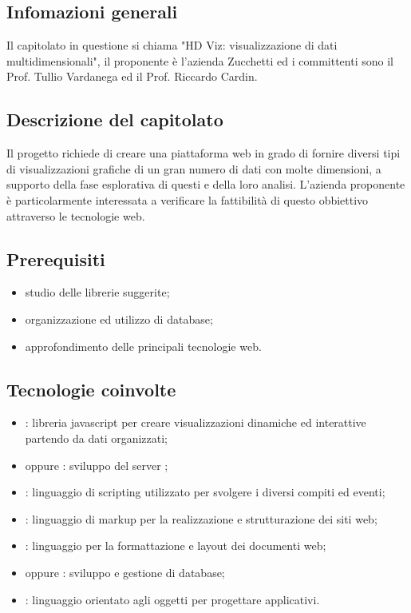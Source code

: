 
\subsection{Infomazioni generali}
Il capitolato in questione si chiama "HD Viz: visualizzazione di dati multidimensionali", il proponente è l'azienda Zucchetti ed i committenti sono il Prof. Tullio Vardanega ed il Prof. Riccardo Cardin.

\subsection{Descrizione del capitolato}
Il progetto richiede di creare una piattaforma web in grado di fornire diversi tipi di visualizzazioni grafiche di un gran numero di dati con molte dimensioni, a supporto della fase esplorativa di questi e della loro analisi. 
L’azienda proponente è particolarmente interessata a verificare la fattibilità di questo obbiettivo attraverso le tecnologie web.

\subsection{Prerequisiti}
\begin{itemize}
\item studio delle librerie suggerite;
\item organizzazione ed utilizzo di database;
\item approfondimento delle principali tecnologie web.
\end{itemize}

\subsection{Tecnologie coinvolte}
\begin{itemize}
\item {}: libreria javascript per creare visualizzazioni dinamiche ed interattive partendo da dati organizzati;
\item {} oppure : sviluppo del server ;
\item {}: linguaggio di scripting utilizzato per svolgere i diversi compiti ed eventi;
\item {}: linguaggio di markup per la realizzazione e strutturazione dei siti web;
\item {}: linguaggio per la formattazione e layout dei documenti web;
\item {} oppure : sviluppo e gestione di database;
\item {}: linguaggio orientato agli oggetti per progettare applicativi.
\end{itemize}

